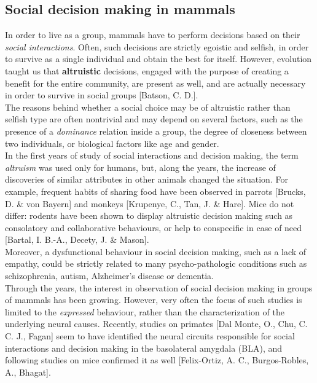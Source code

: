 \documentclass[a4paper]{article}
\begin{document}
\subsection{Social decision making in mammals}

In order to live as a group, mammals have to perform decisions based on their \textit{social interactions}. Often, such decisions are strictly egoistic and selfish, in order to survive as a single individual and obtain the best for itself. However, evolution taught us that \textbf{altruistic} decisions, engaged with the purpose of creating a benefit for the entire community, are present as well, and are actually necessary in order to survive in social groups [Batson, C. D.].\\
The reasons behind whether a social choice may be of altruistic rather than selfish type are often nontrivial and may depend on several factors, such as the presence of a \textit{dominance} relation inside a group, the degree of closeness between two individuals, or biological factors like age and gender.\\
In the first years of study of social interactions and decision making, the term \textit{altruism} was used only for humans, but, along the years, the increase of discoveries of similar attributes in other animals changed the situation. For example, frequent habits of sharing food have been observed in parrots [Brucks, D. \& von Bayern] and monkeys [Krupenye, C., Tan, J. \& Hare]. Mice do not differ: rodents have been shown to display altruistic decision making such as consolatory and collaborative behaviours, or help to conspecific in case of need [Bartal, I. B.-A., Decety, J. \& Mason]. \\
Moreover, a dysfunctional behaviour in social decision making, such as a lack of empathy, could be strictly related to many psycho-pathologic conditions such as schizophrenia, autism, Alzheimer's disease or dementia. \\
Through the years, the interest in observation of social decision making in groups of mammals has been growing. However, very often the focus of such studies is limited to the \textit{expressed} behaviour, rather than the characterization of the underlying neural causes. Recently, studies on primates [Dal Monte, O., Chu, C. C. J., Fagan] seem to have identified the neural circuits responsible for social interactions and decision making in the basolateral amygdala (BLA), and following studies on mice confirmed it as well [Felix-Ortiz, A. C., Burgos-Robles, A., Bhagat].
\end{document}
